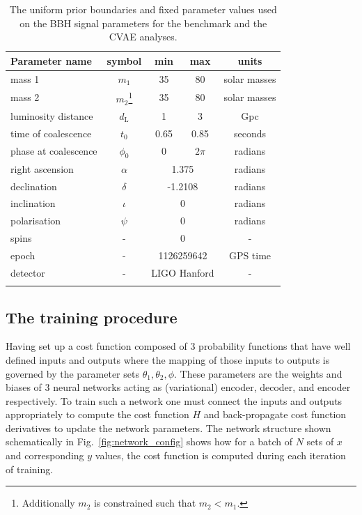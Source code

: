 %
%
\begin{table}
\centering
\caption[The uniform prior boundaries and fixed parameter values used on the \ac{BBH} signal parameters for the benchmark
and the \ac{CVAE} analyses.]{The uniform prior boundaries and fixed parameter values used on the \ac{BBH} signal parameters for the benchmark
and the \ac{CVAE} analyses.}
\begin{tabular}[t]{lcccc}
\toprule
Parameter name & symbol & min & max & units \\
\hline
mass 1 & $m_1$ & 35 & 80 & solar masses \\
mass 2 & $m_2$\footnote{Additionally $m_2$ is constrained such that
$m_{2}<m_{1}$.} & 35 & 80 & solar masses \\
luminosity distance & $d_{\text{L}}$ & 1 & 3 & Gpc \\
time of coalescence & $t_{0}$ & 0.65 & 0.85 & seconds \\
phase at coalescence & $\phi_{0}$ & 0 & $2\pi$ & radians \\
\hline
right ascension & $\alpha$ & \multicolumn{2}{c}{1.375} & radians \\
declination & $\delta$ & \multicolumn{2}{c}{-1.2108} & radians \\
inclination & $\iota$ & \multicolumn{2}{c}{0} & radians \\
polarisation & $\psi$ & \multicolumn{2}{c}{0} & radians \\
spins & - & \multicolumn{2}{c}{0} & - \\
epoch & - & \multicolumn{2}{c}{1126259642} & GPS time \\
detector & - & \multicolumn{2}{c}{LIGO Hanford} & - \\
\botrule
\end{tabular}
\label{tab:prior_ranges}
\end{table}

\subsection{The training procedure}
%
%
Having set up a cost function composed of 3 probability functions that have
well defined inputs and outputs where the mapping of those inputs to outputs is
governed by the parameter sets $\theta_{1},\theta_{2},\phi$. These parameters
are the weights and biases of 3 neural networks acting as (variational)
encoder, decoder, and encoder respectively. To train such a network one must
connect the inputs and outputs appropriately to compute the cost function $H$
and back-propagate cost function derivatives to update the network parameters.
The network structure shown schematically in Fig.~\ref{fig:network_config}
shows how for a batch of $N$ sets of $x$ and corresponding $y$ values, the cost
function is computed during each iteration of training. 

